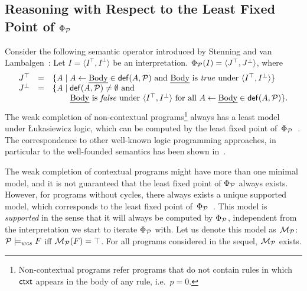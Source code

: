 \documentclass[12pt]{article}
\begin{document}
\subsection{Reasoning with Respect to the Least Fixed Point of $\Phi_{{\cal P}}$}\label{sect:lfp}


Consider the following semantic operator introduced by Stenning and van Lambalgen~\cite{stenning:vanlambalgen:2008}: Let $I = \langle I^\top,I^\bot
\rangle$ be an interpretation. $\Phi_{\cal P} (I) =
\langle J^\top,J^\bot\rangle$, where
\[
\begin{array}{lcl}
J^\top & = & \{ A \mid A \leftarrow \Body \in \Def(A,\CalP)
\mbox{ and
} \Body \mbox{ is \True under } \langle I^\top,I^\bot \rangle \} \\
J^\bot & = & \{ A \mid \Def(A,\CalP) \neq \emptyset \mbox{ and }\\
&& \rule{7.5mm}{0mm}\Body \mbox{ is \False under } \langle
I^\top,I^\bot \rangle \mbox{ for all }  A \leftarrow \Body \in \Def(A,\CalP)\}.
\end{array}\Shrink
\]
The weak completion of non-contextual programs\footnote{Non-contextual programs refer programs that do not contain rules in which $\mathsf{ctxt}$ appears in the body of any rule, i.e.\ $p = 0$.} 
always has a least model under  {\L}ukasiewicz logic,
which can be computed by the least fixed point of~$\Phi_{{\cal P}}$~\cite{hk:2009a}. The correspondence to other well-known logic programming approaches, in particular 
to the well-founded semantics has been shown in~\cite{dietz:hoelldobler:wernhard:2014}.
 
The weak completion of contextual
programs might have more than one minimal model, and it is not guaranteed that 
the least fixed point of $\Phi_{{\cal P}}$ always exists. However,
for programs without cycles, there always exists a unique supported model,
which corresponds to the least fixed point of~$\Phi_{{\cal P}}$~\cite{dietz:hoelldobler:pereira:2017,dietz:hoelldobler:philipp:2017}. This model is \textit{supported} in the sense that 
it will always be computed by $\Phi_{{\cal P}}$, independent from the interpretation we start to iterate $\Phi_{{\cal P}}$ with. Let us denote this model as ${\cal M}_{\cal P}$:
${\cal P} \models_{wcs} F$ iff ${\cal M}_{\cal P}(F) = \top$.
For all programs considered in the sequel, ${\cal M}_{\cal P}$ exists.
\end{document}

